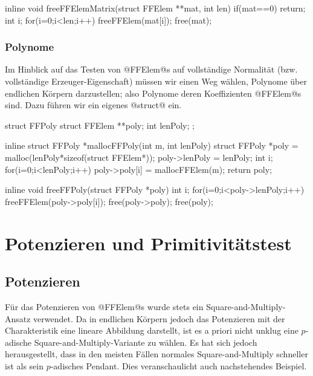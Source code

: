 \begin{ccode}[caption={[\texttt{void freeFFElemMatrix} aus 
 \url{../Sage/enumeratePCNs.c}]Aus \url{../Sage/enumeratePCNs.c}}]
inline void freeFFElemMatrix(struct FFElem **mat, int len){
    if(mat==0) return;
    int i;
    for(i=0;i<len;i++) freeFFElem(mat[i]);
    free(mat);
}
\end{ccode}


\subsubsection{Polynome}
Im Hinblick auf das Testen von @FFElem@s auf vollständige Normalität 
(bzw. vollständige Erzeuger-Eigenschaft) müssen wir einen Weg wählen, Polynome
über endlichen Körpern darzustellen; also Polynome deren Koeffizienten 
@FFElem@s sind. Dazu führen wir ein eigenes @struct@ ein.

\begin{ccode}[caption={[\texttt{struct FFPoly} aus 
 \url{../Sage/enumeratePCNs.c}]Aus \url{../Sage/enumeratePCNs.c}}]
struct FFPoly{
    struct FFElem **poly;
    int lenPoly;
};
\end{ccode}


\begin{ccode}[caption={[\texttt{FFPoly* mallocFFPoly} aus 
 \url{../Sage/enumeratePCNs.c}]Aus \url{../Sage/enumeratePCNs.c}}]
inline struct FFPoly *mallocFFPoly(int m, int lenPoly){
    struct FFPoly *poly = malloc(lenPoly*sizeof(struct FFElem*));
    poly->lenPoly = lenPoly;
    int i;
    for(i=0;i<lenPoly;i++) poly->poly[i] = mallocFFElem(m);
    return poly;
}
\end{ccode}  

\begin{ccode}[caption={[\texttt{void freeFFPoly} aus 
 \url{../Sage/enumeratePCNs.c}]Aus \url{../Sage/enumeratePCNs.c}}]
inline void freeFFPoly(struct FFPoly *poly){
    int i;
    for(i=0;i<poly->lenPoly;i++) freeFFElem(poly->poly[i]);
    free(poly->poly);
    free(poly);
}
\end{ccode}  


\section{Potenzieren und Primitivitätstest}

\subsection{Potenzieren}
Für das Potenzieren von @FFElem@s wurde stets ein Square-and-Multiply-Ansatz
verwendet. Da in endlichen Körpern jedoch das Potenzieren mit der
Charakteristik eine lineare Abbildung darstellt, ist es a priori nicht unklug
eine $p$-adische Square-and-Multiply-Variante zu wählen. Es hat sich jedoch
herausgestellt, dass in den meisten Fällen normales Square-and-Multiply
schneller ist als sein $p$-adisches Pendant. Dies veranschaulicht auch
nachstehendes Beispiel.

